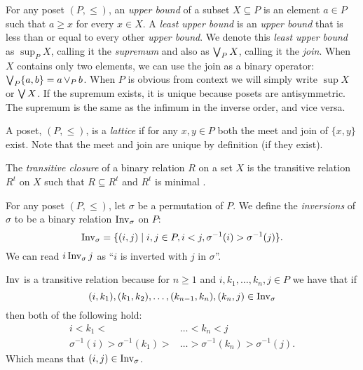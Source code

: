 	\begin{definition}
		For any poset $(P, \le)$, an \emph{upper bound} of a subset $X \subseteq P$ is an element $a \in P$ such that $a \ge x$ for every $x \in X$. A \emph{least upper bound} is an \emph{upper bound} that is less than or equal to every other \emph{upper bound}. We denote this \emph{least upper bound} as $\sup_P X$, calling it the \emph{supremum} \cite{birkhoﬀ1967lattice} and also as $\operatorname{\bigvee}_P X$, calling it the \emph{join}. When $X$ contains only two elements, we can use the join as a binary operator: $\operatorname{\bigvee}_P \{a, b\} = a \operatorname{\vee}_P b$. When $P$ is obvious from context we will simply write $\sup X$ or $\operatorname{\bigvee} X$. If the supremum exists, it is unique because posets are antisymmetric. The supremum is the same as the infimum in the inverse order, and vice versa.
	\end{definition}

	\begin{definition}
		\label{lattice-definition}
		A poset, $(P, \le)$, is a \emph{lattice} if for any $x, y \in P$ both the meet and join of $\{x, y\}$ exist. Note that the meet and join are unique by definition (if they exist).
	\end{definition}

	\begin{definition}
		\label{transitive-closure-definition}
		The \emph{transitive closure} of a binary relation $R$ on a set $X$ is the transitive relation $R^t$ on $X$ such that $R \subseteq R^t$ and $R^t$ is minimal \cite[p. 337]{lidl1998applied}.
	\end{definition}

	\begin{definition}
		\label{inversion-definition}
		For any poset $(P, \le)$, let $\sigma$ be a permutation of $P$. We define the \emph{inversions} of $\sigma$ to be a binary relation $\operatorname{Inv}_{\sigma}$ on $P$:
		\[
			\operatorname{Inv}_{\sigma} = \{(i,j) \mid i, j \in P, i < j, \sigma^{-1}(i) > \sigma^{-1}(j)\}.
		\]
		We can read $i \operatorname{Inv}_{\sigma} j$ as ``$i$ is inverted with $j$ in $\sigma$''.

		$\operatorname{Inv}$ is a transitive relation because for $n \ge 1$ and $i, k_1, \ldots, k_n, j \in P$ we have that if
		\[
			(i, k_1), (k_1, k_2), \ldots, (k_{n-1}, k_{n}), (k_{n}, j) \in \operatorname{Inv}_{\sigma}
		\]
		then both of the following hold:
		\begin{align*}
			i < k_1 < & \ldots < k_n < j \\
			\sigma^{-1}(i) > \sigma^{-1}(k_1) > & \ldots > \sigma^{-1}(k_n) > \sigma^{-1}(j).
		\end{align*}
		Which means that $(i, j) \in \operatorname{Inv}_{\sigma}$.
	\end{definition}

